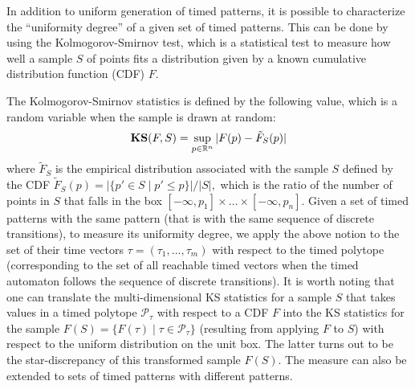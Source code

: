 In addition to uniform generation of timed patterns, it is possible to characterize the ``uniformity degree'' of a given set of timed patterns. This can be done by using the Kolmogorov-Smirnov test, which is a statistical test to measure how well a sample $S$ of points fits a distribution given by a known cumulative distribution function (CDF) $F$. %

The Kolmogorov-Smirnov statistics is defined by the following value, which is a random variable when the sample is drawn at random:
$$\mathbf{KS}(F,S)=\sup_{p\in\mathbb{R}^n}|F(p)-\tilde F_S(p)|$$
where $\tilde F_S$ is the empirical distribution associated with the sample $S$ defined by the CDF 
$\tilde F_S(p)=|\{p'\in S\mid  p'\leq p\}|/|S|,$ which is the ratio of the number of points in $S$ that falls in the box $[-\infty, p_1]\times \ldots\times [-\infty, p_n].$ 
Given a set of timed patterns with the same pattern (that is with the same sequence of discrete transitions), to measure its uniformity degree, we apply the above notion to the set of their time vectors $\tau = (\tau_1, \ldots, \tau_m)$ with respect to the timed polytope (corresponding to the set of all reachable timed vectors when the timed automaton follows the sequence of discrete transitions). It is worth noting that one can translate the multi-dimensional KS statistics for a sample $S$ that takes values in a timed polytope $\mathcal{P}_{\tau}$ with respect to a CDF $F$  into the KS statistics for the sample $F(S)=\{F(\tau)\mid  \tau \in \mathcal{P}_{\tau}\}$ (resulting from applying $F$ to $S$) with respect to the uniform distribution on the unit box. The latter turns out to be the star-discrepancy of this transformed sample $F(S)$. The measure can also be extended to sets of timed patterns  with different patterns.

